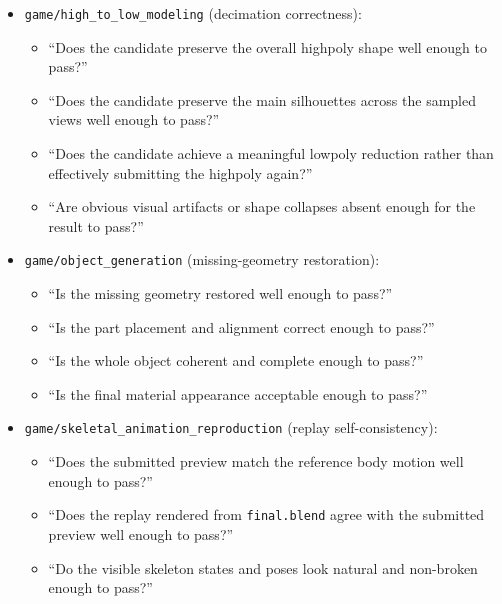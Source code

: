 \documentclass{llmxive}
\begin{document}
\begin{itemize}[nosep,leftmargin=1.2em]
    \begin{itemize}[nosep,leftmargin=1.2em]
        \item ``Is the texture placement and orientation correct enough to pass?''
        \item ``Does the candidate preserve the reference material appearance and color palette well enough to pass?''
        \item ``Are obvious UV seams, stretching, or texture artifacts absent enough for the result to pass?''
    \end{itemize}
    \item \texttt{game/high\_to\_low\_modeling} (decimation correctness):
    \begin{itemize}[nosep,leftmargin=1.2em]
        \item ``Does the candidate preserve the overall highpoly shape well enough to pass?''
        \item ``Does the candidate preserve the main silhouettes across the sampled views well enough to pass?''
        \item ``Does the candidate achieve a meaningful lowpoly reduction rather than effectively submitting the highpoly again?''
        \item ``Are obvious visual artifacts or shape collapses absent enough for the result to pass?''
    \end{itemize}
    \item \texttt{game/object\_generation} (missing-geometry restoration):
    \begin{itemize}[nosep,leftmargin=1.2em]
        \item ``Is the missing geometry restored well enough to pass?''
        \item ``Is the part placement and alignment correct enough to pass?''
        \item ``Is the whole object coherent and complete enough to pass?''
        \item ``Is the final material appearance acceptable enough to pass?''
    \end{itemize}
    \item \texttt{game/skeletal\_animation\_reproduction} (replay self-consistency):
    \begin{itemize}[nosep,leftmargin=1.2em]
        \item ``Does the submitted preview match the reference body motion well enough to pass?''
        \item ``Does the replay rendered from \texttt{final.blend} agree with the submitted preview well enough to pass?''
        \item ``Do the visible skeleton states and poses look natural and non-broken enough to pass?''
    \end{itemize}
\end{itemize}
\end{document}
